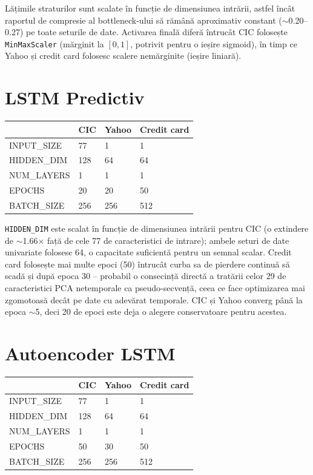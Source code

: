 Lățimile straturilor sunt scalate în funcție de dimensiunea intrării, astfel încât raportul de compresie al bottleneck-ului să rămână aproximativ constant ($\sim$0.20--0.27) pe toate seturile de date. Activarea finală diferă întrucât CIC folosește \texttt{MinMaxScaler} (mărginit la $[0,1]$, potrivit pentru o ieșire sigmoid), în timp ce Yahoo și credit card folosesc scalere nemărginite (ieșire liniară).

\section{LSTM Predictiv}

\begin{center}
\begin{tabular}{@{}llll@{}}
\toprule
 & CIC & Yahoo & Credit card \\
\midrule
INPUT\_SIZE & 77 & 1 & 1 \\
HIDDEN\_DIM & 128 & 64 & 64 \\
NUM\_LAYERS & 1 & 1 & 1 \\
EPOCHS & 20 & 20 & 50 \\
BATCH\_SIZE & 256 & 256 & 512 \\
\bottomrule
\end{tabular}
\end{center}

\texttt{HIDDEN\_DIM} este scalat în funcție de dimensiunea intrării pentru CIC (o extindere de $\sim$1.66$\times$ față de cele 77 de caracteristici de intrare); ambele seturi de date univariate folosesc 64, o capacitate suficientă pentru un semnal scalar. Credit card folosește mai multe epoci (50) întrucât curba sa de pierdere continuă să scadă și după epoca 30 -- probabil o consecință directă a tratării celor 29 de caracteristici PCA netemporale ca pseudo-secvență, ceea ce face optimizarea mai zgomotoasă decât pe date cu adevărat temporale. CIC și Yahoo converg până la epoca $\sim$5, deci 20 de epoci este deja o alegere conservatoare pentru acestea.

\section{Autoencoder LSTM}

\begin{center}
\begin{tabular}{llll}
\toprule
 & CIC & Yahoo & Credit card \\
\midrule
INPUT\_SIZE & 77 & 1 & 1 \\
HIDDEN\_DIM & 128 & 64 & 64 \\
NUM\_LAYERS & 1 & 1 & 1 \\
EPOCHS & 50 & 30 & 50 \\
BATCH\_SIZE & 256 & 256 & 512 \\
\bottomrule
\end{tabular}
\end{center}

